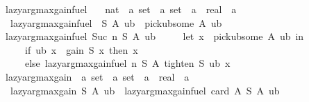 \begin{isabellebody}
{\isafoldproof}%
%
\isadelimproof
\isanewline
%
\endisadelimproof
\isanewline
{}\isamarkupfalse%
\ lazy{\isacharunderscore}{\kern0pt}argmax{\isacharunderscore}{\kern0pt}gain{\isacharunderscore}{\kern0pt}fuel\ {\isacharcolon}{\kern0pt}{\isacharcolon}{\kern0pt}\isanewline
\ \ {\isachardoublequoteopen}nat\ {\isasymRightarrow}\ {\isacharprime}{\kern0pt}a\ set\ {\isasymRightarrow}\ {\isacharprime}{\kern0pt}a\ set\ {\isasymRightarrow}\ {\isacharparenleft}{\kern0pt}{\isacharprime}{\kern0pt}a\ {\isasymRightarrow}\ real{\isacharparenright}{\kern0pt}\ {\isasymRightarrow}\ {\isacharprime}{\kern0pt}a{\isachardoublequoteclose}\isanewline
{}\isanewline
\ \ {\isachardoublequoteopen}lazy{\isacharunderscore}{\kern0pt}argmax{\isacharunderscore}{\kern0pt}gain{\isacharunderscore}{\kern0pt}fuel\ {}\ S\ A\ ub\ {\isacharequal}{\kern0pt}\ pick{\isacharunderscore}{\kern0pt}ub{\isacharunderscore}{\kern0pt}some\ A\ ub{\isachardoublequoteclose}\isanewline
{\isacharbar}{\kern0pt}\ {\isachardoublequoteopen}lazy{\isacharunderscore}{\kern0pt}argmax{\isacharunderscore}{\kern0pt}gain{\isacharunderscore}{\kern0pt}fuel\ {\isacharparenleft}{\kern0pt}Suc\ n{\isacharparenright}{\kern0pt}\ S\ A\ ub\ {\isacharequal}{\kern0pt}\isanewline
\ \ \ \ {\isacharparenleft}{\kern0pt}let\ x\ {\isacharequal}{\kern0pt}\ pick{\isacharunderscore}{\kern0pt}ub{\isacharunderscore}{\kern0pt}some\ A\ ub\ in\isanewline
\ \ \ \ \ if\ ub\ x\ {\isacharequal}{\kern0pt}\ gain\ S\ x\ then\ x\isanewline
\ \ \ \ \ else\ lazy{\isacharunderscore}{\kern0pt}argmax{\isacharunderscore}{\kern0pt}gain{\isacharunderscore}{\kern0pt}fuel\ n\ S\ A\ {\isacharparenleft}{\kern0pt}tighten\ S\ ub\ x{\isacharparenright}{\kern0pt}{\isacharparenright}{\kern0pt}{\isachardoublequoteclose}\isanewline
\isanewline
{}\isamarkupfalse%
\ lazy{\isacharunderscore}{\kern0pt}argmax{\isacharunderscore}{\kern0pt}gain\ {\isacharcolon}{\kern0pt}{\isacharcolon}{\kern0pt}\ {\isachardoublequoteopen}{\isacharprime}{\kern0pt}a\ set\ {\isasymRightarrow}\ {\isacharprime}{\kern0pt}a\ set\ {\isasymRightarrow}\ {\isacharparenleft}{\kern0pt}{\isacharprime}{\kern0pt}a\ {\isasymRightarrow}\ real{\isacharparenright}{\kern0pt}\ {\isasymRightarrow}\ {\isacharprime}{\kern0pt}a{\isachardoublequoteclose}\ \isanewline
\ \ {\isachardoublequoteopen}lazy{\isacharunderscore}{\kern0pt}argmax{\isacharunderscore}{\kern0pt}gain\ S\ A\ ub\ {\isacharequal}{\kern0pt}\ lazy{\isacharunderscore}{\kern0pt}argmax{\isacharunderscore}{\kern0pt}gain{\isacharunderscore}{\kern0pt}fuel\ {\isacharparenleft}{\kern0pt}card\ A{\isacharparenright}{\kern0pt}\ S\ A\ ub{\isachardoublequoteclose}\isanewline

\end{isabellebody}
